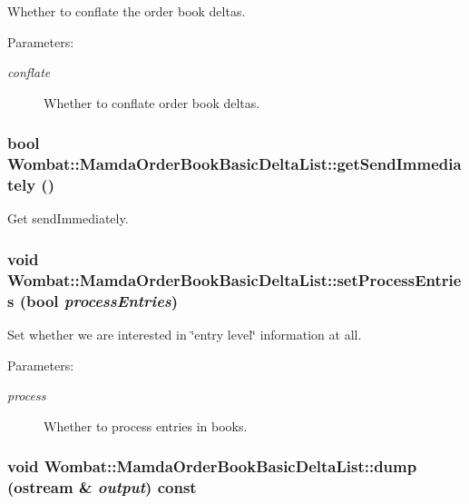 Whether to conflate the order book deltas. 

\begin{Desc}
\item[Parameters:]
\begin{description}
\item[{\em conflate}]Whether to conflate order book deltas. \end{description}
\end{Desc}
\hypertarget{classWombat_1_1MamdaOrderBookBasicDeltaList_e05386ca5d3ac2d1931022a316baa2b5}{
\subsubsection[getSendImmediately]{\setlength{\rightskip}{0pt plus 5cm}bool Wombat::Mamda\-Order\-Book\-Basic\-Delta\-List::get\-Send\-Immediately ()}}
\label{classWombat_1_1MamdaOrderBookBasicDeltaList_e05386ca5d3ac2d1931022a316baa2b5}


Get send\-Immediately. 

\hypertarget{classWombat_1_1MamdaOrderBookBasicDeltaList_ffe27ce620459c70050d9aee60160dc7}{
\subsubsection[setProcessEntries]{\setlength{\rightskip}{0pt plus 5cm}void Wombat::Mamda\-Order\-Book\-Basic\-Delta\-List::set\-Process\-Entries (bool {\em process\-Entries})}}
\label{classWombat_1_1MamdaOrderBookBasicDeltaList_ffe27ce620459c70050d9aee60160dc7}


Set whether we are interested in \char`\"{}entry level\char`\"{} information at all. 

\begin{Desc}
\item[Parameters:]
\begin{description}
\item[{\em process}]Whether to process entries in books. \end{description}
\end{Desc}
\hypertarget{classWombat_1_1MamdaOrderBookBasicDeltaList_ecec2f875f8ce26984e335842b6f26f0}{
\subsubsection[dump]{\setlength{\rightskip}{0pt plus 5cm}void Wombat::Mamda\-Order\-Book\-Basic\-Delta\-List::dump (ostream \& {\em output}) const}}
\label{classWombat_1_1MamdaOrderBookBasicDeltaList_ecec2f875f8ce26984e335842b6f26f0}


